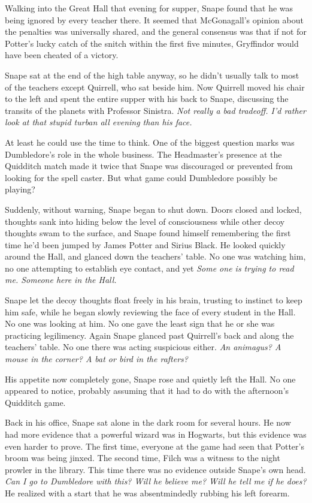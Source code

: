 Walking into the Great Hall that evening for supper, Snape found that he was being ignored by every teacher there. It seemed that McGonagall's opinion about the penalties was universally shared, and the general consensus was that if not for Potter's lucky catch of the snitch within the first five minutes, Gryffindor would have been cheated of a victory.

Snape sat at the end of the high table anyway, so he didn't usually talk to most of the teachers except Quirrell, who sat beside him. Now Quirrell moved his chair to the left and spent the entire supper with his back to Snape, discussing the transits of the planets with Professor Sinistra. \emph{Not really a bad tradeoff. I'd rather look at that stupid turban all evening than his face.}

At least he could use the time to think. One of the biggest question marks was Dumbledore's role in the whole business. The Headmaster's presence at the Quidditch match made it twice that Snape was discouraged or prevented from looking for the spell caster. But what game could Dumbledore possibly be playing?

Suddenly, without warning, Snape began to shut down. Doors closed and locked, thoughts sank into hiding below the level of consciousness while other decoy thoughts swam to the surface, and Snape found himself remembering the first time he'd been jumped by James Potter and Sirius Black. He looked quickly around the Hall, and glanced down the teachers' table. No one was watching him, no one attempting to establish eye contact, and yet{\el} \emph{Some one is trying to read me. Someone here in the Hall.}

Snape let the decoy thoughts float freely in his brain, trusting to instinct to keep him safe, while he began slowly reviewing the face of every student in the Hall. No one was looking at him. No one gave the least sign that he or she was practicing legilimency. Again Snape glanced past Quirrell's back and along the teachers' table. No one there was acting suspicious either. \emph{An animagus? A mouse in the corner? A bat or bird in the rafters?}

His appetite now completely gone, Snape rose and quietly left the Hall. No one appeared to notice, probably assuming that it had to do with the afternoon's Quidditch game.

Back in his office, Snape sat alone in the dark room for several hours. He now had more evidence that a powerful wizard was in Hogwarts, but this evidence was even harder to prove. The first time, everyone at the game had seen that Potter's broom was being jinxed. The second time, Filch was a witness to the night prowler in the library. This time there was no evidence outside Snape's own head. \emph{Can I go to Dumbledore with this? Will he believe me? Will he tell me if he does?} He realized with a start that he was absentmindedly rubbing his left forearm.

